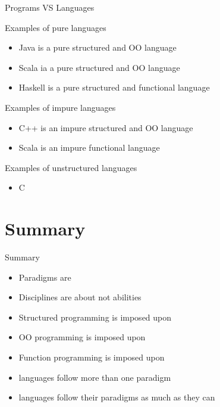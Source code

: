 \begin{frame}{Programs VS Languages}
\begin{exampleblock}{Examples of pure languages}
\begin{itemize}
  \item Java is a pure structured and OO language
  \item Scala ia a pure structured and OO language
  \item Haskell is a pure structured and functional language
\end{itemize}
\end{exampleblock}
\pause
\begin{block}{Examples of impure languages}
\begin{itemize}
  \item C++ is an impure structured and OO language
  \item Scala is an impure functional language
\end{itemize}
\pause
\end{block}
\begin{alertblock}{Examples of unstructured languages}
\begin{itemize}
  \item C
\end{itemize}
\end{alertblock}
\end{frame}

\section{Summary}
\begin{frame}{Summary}
\begin{itemize}
  \item Paradigms are 
  \item Disciplines are about  not \alert{abilities}
  \item Structured programming is imposed upon 
  \item OO programming is imposed upon 
  \item Function programming is imposed upon 
  \item {} languages follow more than one paradigm
  \item {} languages follow their paradigms as much as they can
\end{itemize}
\end{frame}